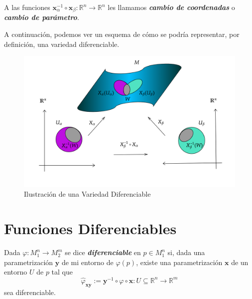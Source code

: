 \begin{definition}
A las funciones $\mathbf{x}_\alpha^{-1}\circ\mathbf{x}_\beta\colon\mathbb{R}^n\to\mathbb{R}^n$ les llamamos \textit{\textbf{cambio de coordenadas}} o \textit{\textbf{cambio de par\'ametro}}.    
\end{definition}
A continuaci\'on, podemos ver un esquema de c\'omo se podr\'ia representar, por definici\'on, una variedad diferenciable.
\begin{figure}[ht]
    \caption{Ilustraci\'on de una Variedad Diferenciable}
    \centering
    \includegraphics[width=\textwidth]{capitulos/variedaddif.png}
\end{figure}
\section{Funciones Diferenciables}

\begin{definition}
Dada $\varphi\colon M_1^n\to M_2^m$ se dice \textit{\textbf{diferenciable}} en $p\in M_1^n$ si, dada una parametrizaci\'on $\mathbf{y}$ de mi entorno de $\varphi(p)$, existe una parametrizaci\'on $\mathbf{x}$ de un entorno $U$ de $p$ tal que
\begin{equation*}
    \hat{\varphi}_{\mathbf{xy}}:=\mathbf{y}^{-1}\circ\varphi\circ\mathbf{x}\colon U\subseteq\mathbb{R}^n\to\mathbb{R}^m
\end{equation*}
sea diferenciable.
\end{definition}

